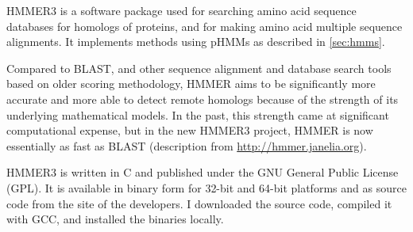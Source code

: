 HMMER3  \citep{eddy2011} is a software package used for searching amino acid sequence
databases for homologs of proteins, and for making amino acid multiple sequence
alignments. It implements methods using pHMMs as described in
\autoref{sec:hmms}.

Compared to BLAST, and other sequence alignment and database search tools based
on older scoring methodology, HMMER aims to be significantly more accurate and
more able to detect remote homologs because of the strength of its underlying
mathematical models. In the past, this strength came at significant
computational expense, but in the new HMMER3 project, HMMER is now essentially
as fast as BLAST (description from \url{http://hmmer.janelia.org}).

HMMER3 is written in C and published under the GNU General Public License (GPL).
It is available in binary form for 32-bit and 64-bit platforms and as source
code from the site of the developers. I downloaded the source code, compiled it
with GCC, and installed the binaries locally. 
